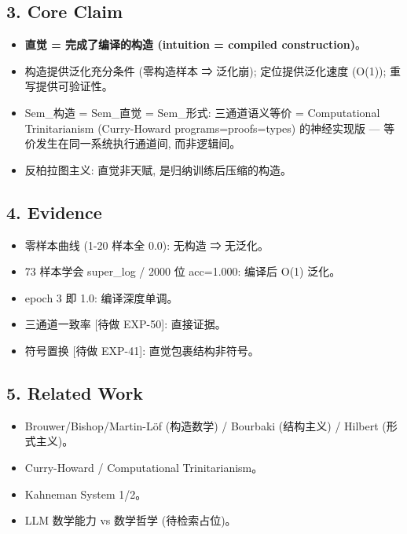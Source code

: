\documentclass[
]{article}
\providecommand{\tightlist}{%
  \setlength{\itemsep}{0pt}\setlength{\parskip}{0pt}}
\begin{document}
\subsection{3. Core Claim}\label{core-claim}

\begin{itemize}
\tightlist
\item
  \textbf{直觉 = 完成了编译的构造 (intuition = compiled construction)}。
\item
  构造提供泛化充分条件 (零构造样本 ⇒ 泛化崩); 定位提供泛化速度 (O(1));
  重写提供可验证性。
\item
  Sem\_构造 = Sem\_直觉 = Sem\_形式: 三通道语义等价 = Computational
  Trinitarianism (Curry-Howard programs=proofs=types) 的神经实现版 ---
  等价发生在同一系统执行通道间, 而非逻辑间。
\item
  反柏拉图主义: 直觉非天赋, 是归纳训练后压缩的构造。
\end{itemize}

\subsection{4. Evidence}\label{evidence}

\begin{itemize}
\tightlist
\item
  零样本曲线 (1-20 样本全 0.0): 无构造 ⇒ 无泛化。
\item
  73 样本学会 super\_log / 2000 位 acc=1.000: 编译后 O(1) 泛化。
\item
  epoch 3 即 1.0: 编译深度单调。
\item
  三通道一致率 {[}待做 EXP-50{]}: 直接证据。
\item
  符号置换 {[}待做 EXP-41{]}: 直觉包裹结构非符号。
\end{itemize}

\subsection{5. Related Work}\label{related-work}

\begin{itemize}
\tightlist
\item
  Brouwer/Bishop/Martin-Löf (构造数学) / Bourbaki (结构主义) / Hilbert
  (形式主义)。
\item
  Curry-Howard / Computational Trinitarianism。
\item
  Kahneman System 1/2。
\item
  LLM 数学能力 vs 数学哲学 (待检索占位)。
\end{itemize}
\end{document}

